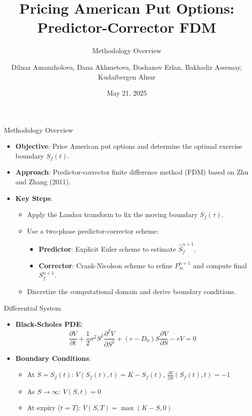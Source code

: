 \documentclass{beamer}
\title{Pricing American Put Options: Predictor-Corrector FDM}
\subtitle{Methodology Overview}
\author{Dilnaz Amanzholova, Dana Akhmetova, Doshanov Erlan, Bakhadir Assemay, Kudaibergen Alnur}
\date{May 21, 2025}
\begin{document}
\begin{frame}
    \titlepage
\end{frame}

\begin{frame}{Methodology Overview}
    \begin{itemize}
        \item \textbf{Objective}: Price American put options and determine the optimal exercise boundary \( S_f(t) \).
        \item \textbf{Approach}: Predictor-corrector finite difference method (FDM) based on Zhu and Zhang (2011).
        \item \textbf{Key Steps}:
        \begin{itemize}
            \item Apply the Landau transform to fix the moving boundary \( S_f(\tau) \).
            \item Use a two-phase predictor-corrector scheme:
            \begin{itemize}
                \item \textbf{Predictor}: Explicit Euler scheme to estimate \( \hat{S}_f^{n+1} \).
                \item \textbf{Corrector}: Crank-Nicolson scheme to refine \( P_m^{n+1} \) and compute final \( S_f^{n+1} \).
            \end{itemize}
            \item Discretize the computational domain and derive boundary conditions.
        \end{itemize}
    \end{itemize}
\end{frame}

\begin{frame}{Differential System}
    \begin{itemize}
        \item \textbf{Black-Scholes PDE}:
        \[
        \frac{\partial V}{\partial t} + \frac{1}{2} \sigma^2 S^2 \frac{\partial^2 V}{\partial S^2} + (r - D_0) S \frac{\partial V}{\partial S} - r V = 0
        \]
        \item \textbf{Boundary Conditions}:
        \begin{itemize}
            \item At \( S = S_f(t) \): \( V(S_f(t), t) = K - S_f(t) \), \( \frac{\partial V}{\partial S}(S_f(t), t) = -1 \)
            \item As \( S \to \infty \): \( V(S, t) = 0 \)
            \item At expiry (\( t = T \)): \( V(S, T) = \max(K - S, 0) \)
        \end{itemize}
    \end{itemize}
\end{frame}
\end{document}

